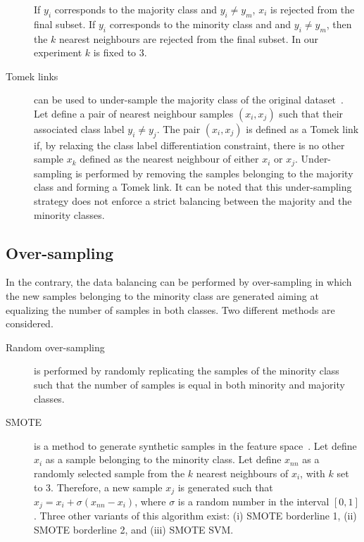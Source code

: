 \documentclass[twoside,11pt]{article}
\begin{document}
\begin{description}
If $y_i$ corresponds to the majority class and $y_i \neq y_m$, $x_i$ is rejected from the final subset.
If $y_i$ corresponds to the minority class and and $y_i \neq y_m$, then the $k$ nearest neighbours are rejected from the final subset.
In our experiment $k$ is fixed to 3.
  \item[Tomek links] can be used to under-sample the majority class of the original dataset~\cite{tomek1976two}.
Let define a pair of nearest neighbour samples $(x_i, x_j)$ such that their associated class label $y_i \neq y_j$.
The pair $(x_i, x_j)$ is defined as a Tomek link if, by relaxing the class label differentiation constraint, there is no other sample $x_k$ defined as the nearest neighbour of either $x_i$ or $x_j$.
Under-sampling is performed by removing the samples belonging to the majority class and forming a Tomek link.
It can be noted that this under-sampling strategy does not enforce a strict balancing between the majority and the minority classes.

\end{description}

\subsection{Over-sampling}

In the contrary, the data balancing can be performed by over-sampling in which the new samples belonging to the minority class are generated aiming at equalizing the number of samples in both classes.
Two different methods are considered.
\begin{description}
\item[Random over-sampling] is performed by randomly replicating the samples of the minority class such that the number of samples is equal in both minority and majority classes.
\end{description}
\begin{description}
\item[SMOTE] is a method to generate synthetic samples in the feature space~\cite{chawla2002smote}.
Let define $x_i$ as a sample belonging to the minority class.
Let define $x_{nn}$ as a randomly selected sample from the $k$ nearest neighbours of $x_i$, with $k$ set to 3.
Therefore, a new sample $x_j$ is generated such that $x_j = x_i + \sigma \left( x_{nn} - x_i \right)$, where $\sigma$ is a random number in the interval $\left[0,1\right]$.
Three other variants of this algorithm exist: (i) SMOTE borderline 1, (ii) SMOTE borderline 2, and (iii) SMOTE SVM.
\end{description}
\end{document}
